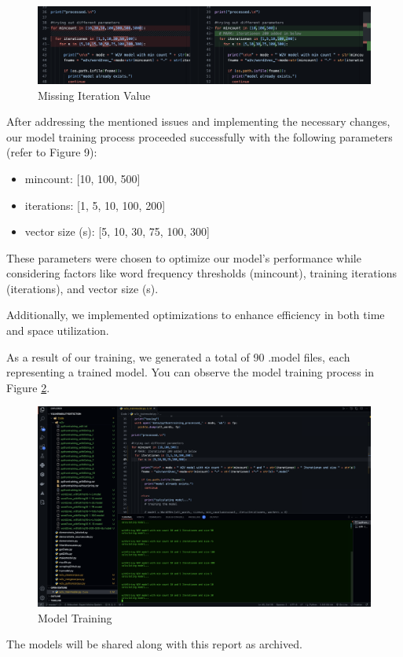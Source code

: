 \begin{figure}
    \centering
    \includegraphics[width=1\linewidth]{pictures/missing_value.png}
    \caption{Missing Iteration Value}
    \label{fig: Figure9}
\end{figure}

After addressing the mentioned issues and implementing the necessary changes, our model training process proceeded successfully with the following parameters (refer to Figure 9):
\begin{itemize}
    \item mincount: [10, 100, 500]
    \item iterations: [1, 5, 10, 100, 200]
    \item vector size (s): [5, 10, 30, 75, 100, 300]
\end{itemize}
These parameters were chosen to optimize our model's performance while considering factors like word frequency thresholds (mincount), training iterations (iterations), and vector size (s).

Additionally, we implemented optimizations to enhance efficiency in both time and space utilization.

As a result of our training, we generated a total of 90 .model files, each representing a trained model. You can observe the model training process in Figure \ref{fig: Figure10}.
\begin{figure}
    \centering
    \includegraphics[width=1\linewidth]{pictures/model_training.png}
    \caption{Model Training}
    \label{fig: Figure10}
\end{figure}
\newline
The models will be shared along with this report as archived.
